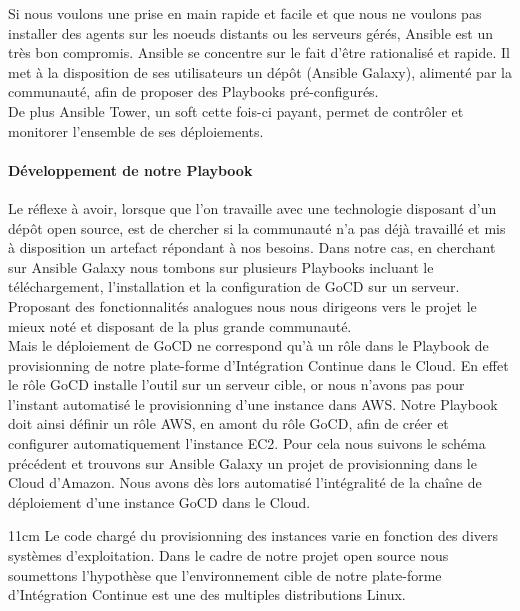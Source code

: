           Si nous voulons une prise en main rapide et facile et que nous ne voulons pas installer des agents sur les noeuds distants ou les serveurs gérés, Ansible est un très bon compromis. Ansible se concentre sur le fait d'être rationalisé et rapide. Il met à la disposition de ses utilisateurs un dépôt (Ansible Galaxy), alimenté par la communauté, afin de proposer des Playbooks pré-configurés.\\

          De plus Ansible Tower, un soft cette fois-ci payant, permet de contrôler et monitorer l'ensemble de ses déploiements.

          \paragraph{Développement de notre Playbook}
          Le réflexe à avoir, lorsque que l'on travaille avec une technologie disposant d'un dépôt open source, est de chercher si la communauté n'a pas déjà travaillé et mis à disposition un artefact répondant à nos besoins. Dans notre cas, en cherchant sur Ansible Galaxy nous tombons sur plusieurs Playbooks incluant le téléchargement, l'installation et la configuration de GoCD sur un serveur. Proposant des fonctionnalités analogues nous nous dirigeons vers le projet le mieux noté et disposant de la plus grande communauté.\\

          Mais le déploiement de GoCD ne correspond qu'à un rôle dans le Playbook de provisionning de notre plate-forme d'Intégration Continue dans le Cloud. En effet le rôle GoCD installe l'outil sur un serveur cible, or nous n'avons pas pour l'instant automatisé le provisionning d'une instance dans AWS. Notre Playbook doit ainsi définir un rôle AWS, en amont du rôle GoCD, afin de créer et configurer automatiquement l'instance EC2. Pour cela nous suivons le schéma précédent et trouvons sur Ansible Galaxy un projet de provisionning dans le Cloud d'Amazon. Nous avons dès lors automatisé l'intégralité de la chaîne de déploiement d'une instance GoCD dans le Cloud.\\

          \begin {boxedminipage} {11cm}
            Le code chargé du provisionning des instances varie en fonction des divers systèmes d'exploitation. Dans le cadre de notre projet open source nous soumettons l'hypothèse que l'environnement cible de notre plate-forme d'Intégration Continue est une des multiples distributions Linux.
          \end {boxedminipage}\\

